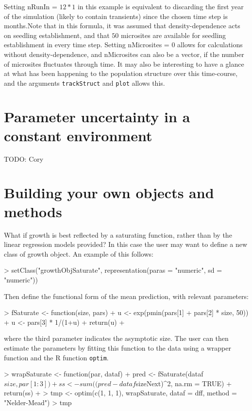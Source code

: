 \documentclass{article}
\begin{document}
Setting nRunIn = $12*1$ in this example is equivalent to discarding the first 
year of the simulation (likely to contain transients) since the chosen time step
is months.Note that in this formula, it was assumed that density-dependence acts on
seedling establishment, and that $50$ microsites are available for seedling
establishment in every time step. Setting nMicrosites = $0$ allows for
calculations without density-dependence, and nMicrosites can also be a vector,
if the number of microsites fluctuates through time. It may also be interesting
to have a glance at what has been happening to the population structure over
this time-course, and the arguments {\tt trackStruct} and {\tt plot} allows this.


\section{Parameter uncertainty in a constant environment}

TODO: Cory


\section{Building your own objects and methods}
What if growth is best reflected by a saturating function, rather than by the
linear regression models provided?  In this case the user may want to define a
new class of growth object.  An example of this follows:
\begin{Schunk}
\begin{Sinput}
> setClass("growthObjSaturate", representation(paras = "numeric", sd = "numeric"))
\end{Sinput}
\end{Schunk}
Then define the functional form of the mean prediction, with relevant parameters: 
\begin{Schunk}
\begin{Sinput}
> fSaturate <- function(size, pars) { 
+     u <- exp(pmin(pars[1] + pars[2] * size, 50))
+     u <- pars[3] * 1/(1+u)
+     return(u)
+ }
\end{Sinput}
\end{Schunk}
where the third parameter indicates the asymptotic size. The user can then
estimate the parameters by fitting this function to the data using a wrapper
function and the R function {\tt optim}.
\begin{Schunk}
\begin{Sinput}
> wrapSaturate <- function(par, dataf) { 
+     pred <- fSaturate(dataf$size, par[1:3])
+     ss <- sum((pred - dataf$sizeNext)^2, na.rm = TRUE)
+     return(ss)
+     }
> tmp <- optim(c(1, 1, 1), wrapSaturate, dataf = dff, method = "Nelder-Mead")
> tmp    
\end{Sinput}
\end{Schunk}
\end{document}
